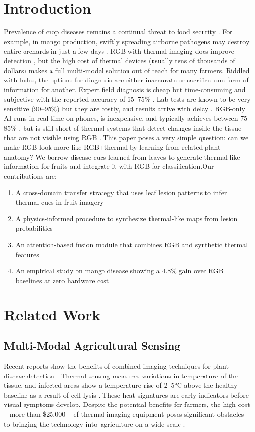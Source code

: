 \documentclass[utf8]{FrontiersinHarvard} %
\begin{document}
\section{Introduction}
Prevalence of crop diseases remains a continual threat to food security \cite{fao2021}. For example, in mango production, swiftly spreading airborne pathogens may destroy entire orchards in just a few days \cite{singh2019}. RGB with thermal imaging does improve detection \cite{khanal2017}, but the high cost of thermal devices (usually tens of thousands of dollars) makes a full multi-modal solution out of reach for many farmers.
Riddled with holes, the options for diagnosis are either inaccurate or sacrifice one form of information for another. Expert field diagnosis is cheap but time-consuming and subjective with the reported accuracy of 65–75\% \cite{ferentinos2018}. Lab tests are known to be very sensitive (90–95\%) but they are costly, and results arrive with delay \cite{martinelli2015}. RGB-only AI runs in real time on phones, is inexpensive, and typically achieves between 75–85\% \cite{mohanty2016,pineda2021}, but is still short of thermal systems that detect changes inside the tissue that are not visible using RGB \cite{pineda2021}.
This paper poses a very simple question: can we make RGB look more like RGB+thermal by learning from related plant anatomy? We borrow disease cues learned from leaves to generate thermal-like information for fruits and integrate it with RGB for classification.Our contributions are: 

\begin{enumerate}
    \item A cross-domain transfer strategy that uses leaf lesion patterns to infer thermal cues in fruit imagery
    \item A physics-informed procedure to synthesize thermal-like maps from lesion probabilities
    \item An attention-based fusion module that combines RGB and synthetic thermal features
    \item An empirical study on mango disease showing a 4.8\% gain over RGB baselines at zero hardware cost
\end{enumerate}

\section{Related Work}

\subsection{Multi-Modal Agricultural Sensing}
Recent reports show the benefits of combined imaging techniques for plant disease detection \cite{maimaitijiang2020}. Thermal sensing measures variations in temperature of the tissue, and infected areas show a temperature rise of 2–5°C above the healthy baseline as a result of cell lysis \cite{mahlein2016}. These heat signatures are early indicators before visual symptoms develop. Despite the potential benefits for farmers, the high cost – more than \$25,000 – of thermal imaging equipment poses significant obstacles to bringing the technology into agriculture on a wide scale \cite{sishodia2020}. 
\end{document}
